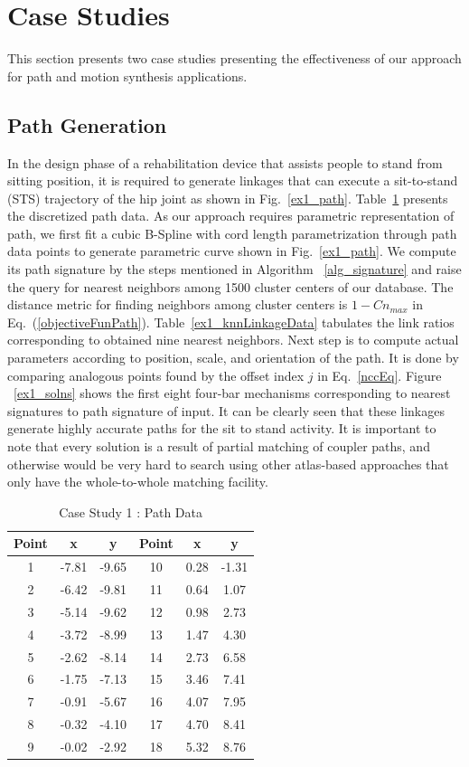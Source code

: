 \documentclass[twocolumn,10pt]{asme2ej}
\newcommand{\req}[1]{(\ref{#1})}
\begin{document}
\section{Case Studies}\label{sec_example}
This section presents two case studies presenting the effectiveness of our approach for path and motion synthesis applications.
\subsection{Path Generation}
In the design phase of a rehabilitation device that assists people to stand from sitting position, it is required to generate linkages that can execute a sit-to-stand (STS) trajectory of the hip joint as shown in Fig.~\ref{ex1_path}.
Table~\ref{hipPathTab} presents the discretized path data.
As our approach requires parametric representation of path, we first fit a cubic B-Spline with cord length parametrization through path data points to generate parametric curve shown in Fig.~\ref{ex1_path}.
We compute its path signature by the steps mentioned in Algorithm ~\ref{alg_signature} and raise the query for nearest neighbors among 1500 cluster centers of our database.
The distance metric for finding neighbors among cluster centers is $1-Cn_{max}$ in Eq.~\req{objectiveFunPath}.
Table~\ref{ex1_knnLinkageData} tabulates the link ratios corresponding to obtained nine nearest neighbors.
Next step is to compute actual parameters according to position, scale, and orientation of the path.
It is done by comparing analogous points found by the offset index $j$ in Eq.~\ref{nccEq}.
Figure ~\ref{ex1_solns} shows the first eight four-bar mechanisms corresponding to nearest signatures to path signature of input.
It can be clearly seen that these linkages generate highly accurate paths for the sit to stand activity.
It is important to note that every solution is a result of partial matching of coupler paths, and otherwise would be very hard to search using other atlas-based approaches that only have the whole-to-whole matching facility.

\begin{table}
\caption{Case Study 1 : Path Data}
\centering
\label{hipPathTab}
\begin{tabular}{cccccc}
\hline
Point & x & y & Point & x & y \\
\hline
1 & -7.81 & -9.65 & 10 & 0.28 & -1.31 \\
2 & -6.42 & -9.81 & 11 & 0.64 & 1.07 \\
3 & -5.14 & -9.62 & 12 & 0.98 & 2.73 \\
4 & -3.72 & -8.99 & 13 & 1.47 & 4.30 \\
5 & -2.62 & -8.14 & 14 & 2.73 & 6.58 \\
6 & -1.75 & -7.13 & 15 & 3.46 & 7.41 \\
7 & -0.91 & -5.67 & 16 & 4.07 & 7.95 \\
8 & -0.32 & -4.10 & 17 & 4.70 & 8.41 \\
9 & -0.02 & -2.92 & 18 & 5.32 & 8.76 \\
\end{tabular}
\end{table}
\end{document}
